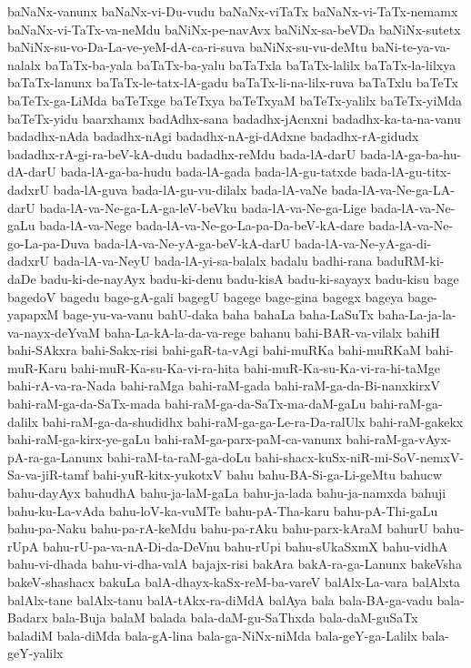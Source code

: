 {baNaNx-vanunx
baNaNx-vi-Du-vudu
baNaNx-viTaTx
baNaNx-vi-TaTx-nemamx
baNaNx-vi-TaTx-va-neMdu
baNiNx-pe-navAvx
baNiNx-sa-beVDa
baNiNx-sutetx
baNiNx-su-vo-Da-La-ve-yeM-dA-ca-ri-suva
baNiNx-su-vu-deMtu
baNi-te-ya-va-nalalx
baTaTx-ba-yala
baTaTx-ba-yalu
baTaTxla
baTaTx-lalilx
baTaTx-la-lilxya
baTaTx-lanunx
baTaTx-le-tatx-lA-gadu
baTaTx-li-na-lilx-ruva
baTaTxlu
baTeTx
baTeTx-ga-LiMda
baTeTxge
baTeTxya
baTeTxyaM
baTeTx-yalilx
baTeTx-yiMda
baTeTx-yidu
baarxhamx
badAdhx-sana
badadhx-jAcnxni
badadhx-ka-ta-na-vanu
badadhx-nAda
badadhx-nAgi
badadhx-nA-gi-dAdxne
badadhx-rA-gidudx
badadhx-rA-gi-ra-beV-kA-dudu
badadhx-reMdu
bada-lA-darU
bada-lA-ga-ba-hu-dA-darU
bada-lA-ga-ba-hudu
bada-lA-gada
bada-lA-gu-tatxde
bada-lA-gu-titx-dadxrU
bada-lA-guva
bada-lA-gu-vu-dilalx
bada-lA-vaNe
bada-lA-va-Ne-ga-LA-darU
bada-lA-va-Ne-ga-LA-ga-leV-beVku
bada-lA-va-Ne-ga-Lige
bada-lA-va-Ne-gaLu
bada-lA-va-Nege
bada-lA-va-Ne-go-La-pa-Da-beV-kA-dare
bada-lA-va-Ne-go-La-pa-Duva
bada-lA-va-Ne-yA-ga-beV-kA-darU
bada-lA-va-Ne-yA-ga-di-dadxrU
bada-lA-va-NeyU
bada-lA-yi-sa-balalx
badalu
badhi-rana
baduRM-ki-daDe
badu-ki-de-nayAyx
badu-ki-denu
badu-kisA
badu-ki-sayayx
badu-kisu
bage
bagedoV
bagedu
bage-gA-gali
bagegU
bagege
bage-gina
bagegx
bageya
bage-yapapxM
bage-yu-va-vanu
bahU-daka
baha
bahaLa
baha-LaSuTx
baha-La-ja-la-va-nayx-deYvaM
baha-La-kA-la-da-va-rege
bahanu
bahi-BAR-va-vilalx
bahiH
bahi-SAkxra
bahi-Sakx-risi
bahi-gaR-ta-vAgi
bahi-muRKa
bahi-muRKaM
bahi-muR-Karu
bahi-muR-Ka-su-Ka-vi-ra-hita
bahi-muR-Ka-su-Ka-vi-ra-hi-taMge
bahi-rA-va-ra-Nada
bahi-raMga
bahi-raM-gada
bahi-raM-ga-da-Bi-nanxkirxV
bahi-raM-ga-da-SaTx-mada
bahi-raM-ga-da-SaTx-ma-daM-gaLu
bahi-raM-ga-dalilx
bahi-raM-ga-da-shudidhx
bahi-raM-ga-ga-Le-ra-Da-ralUlx
bahi-raM-gakekx
bahi-raM-ga-kirx-ye-gaLu
bahi-raM-ga-parx-paM-ca-vanunx
bahi-raM-ga-vAyx-pA-ra-ga-Lanunx
bahi-raM-ta-raM-ga-doLu
bahi-shacx-kuSx-niR-mi-SoV-nemxV-Sa-va-jiR-tamf
bahi-yuR-kitx-yukotxV
bahu
bahu-BA-Si-ga-Li-geMtu
bahucw
bahu-dayAyx
bahudhA
bahu-ja-laM-gaLa
bahu-ja-lada
bahu-ja-namxda
bahuji
bahu-ku-La-vAda
bahu-loV-ka-vuMTe
bahu-pA-Tha-karu
bahu-pA-Thi-gaLu
bahu-pa-Naku
bahu-pa-rA-keMdu
bahu-pa-rAku
bahu-parx-kAraM
bahurU
bahu-rUpA
bahu-rU-pa-va-nA-Di-da-DeVnu
bahu-rUpi
bahu-sUkaSxmX
bahu-vidhA
bahu-vi-dhada
bahu-vi-dha-valA
bajajx-risi
bakAra
bakA-ra-ga-Lanunx
bakeVsha
bakeV-shashacx
bakuLa
balA-dhayx-kaSx-reM-ba-vareV
balAlx-La-vara
balAlxta
balAlx-tane
balAlx-tanu
balA-tAkx-ra-diMdA
balAya
bala
bala-BA-ga-vadu
bala-Badarx
bala-Buja
balaM
balada
bala-daM-gu-SaThxda
bala-daM-guSaTx
baladiM
bala-diMda
bala-gA-lina
bala-ga-NiNx-niMda
bala-geY-ga-Lalilx
bala-geY-yalilx
}
